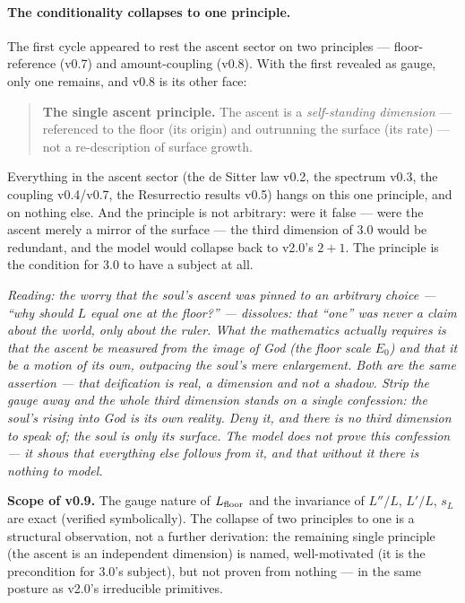 \documentclass[11pt,a4paper]{article}
\newcommand{\note}[1]{\textcolor{black!65}{\emph{#1}}}
\theoremstyle{plain}
\theoremstyle{definition}
\theoremstyle{remark}
\begin{document}
\paragraph{The conditionality collapses to one principle.} The first cycle appeared to rest the ascent
sector on two principles --- floor-reference (v0.7) and amount-coupling (v0.8). With the first revealed
as gauge, only one remains, and v0.8 is its other face:

\begin{quote}
\textbf{The single ascent principle.} The ascent is a \emph{self-standing dimension} --- referenced to
the floor (its origin) and outrunning the surface (its rate) --- not a re-description of surface growth.
\end{quote}

Everything in the ascent sector (the de Sitter law v0.2, the spectrum v0.3, the coupling v0.4/v0.7, the
Resurrectio results v0.5) hangs on this one principle, and on nothing else. And the principle is not
arbitrary: were it false --- were the ascent merely a mirror of the surface --- the third dimension of
3.0 would be redundant, and the model would collapse back to v2.0's $2{+}1$. The principle is the
condition for 3.0 to have a subject at all.

\note{Reading: the worry that the soul's ascent was pinned to an arbitrary choice --- ``why should
$L$ equal one at the floor?'' --- dissolves: that ``one'' was never a claim about the world, only about
the ruler. What the mathematics actually requires is that the ascent be measured from the image of God
(the floor scale $E_0$) and that it be a motion of its own, outpacing the soul's mere enlargement. Both
are the same assertion --- that deification is real, a dimension and not a shadow. Strip the gauge away
and the whole third dimension stands on a single confession: the soul's rising into God is its own
reality. Deny it, and there is no third dimension to speak of; the soul is only its surface. The model
does not prove this confession --- it shows that everything else follows from it, and that without it
there is nothing to model.}

\textbf{Scope of v0.9.} The gauge nature of $L_{\rm floor}$ and the invariance of $L''/L$, $L'/L$,
$s_L$ are exact (verified symbolically). The collapse of two principles to one is a structural
observation, not a further derivation: the remaining single principle (the ascent is an independent
dimension) is named, well-motivated (it is the precondition for 3.0's subject), but not proven from
nothing --- in the same posture as v2.0's irreducible primitives.
\end{document}

